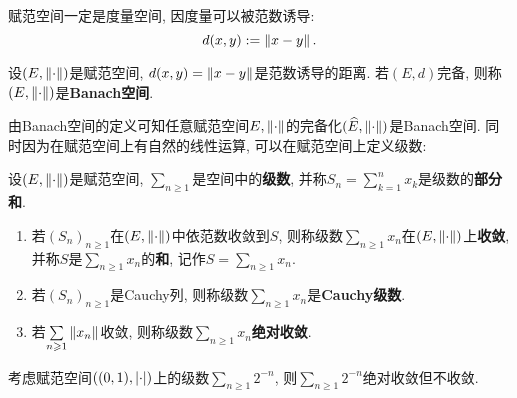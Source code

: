 	\begin{Remark}
	赋范空间一定是度量空间, 因度量可以被范数诱导:
	\[
	d(x,y):=\left\| x-y \right\|.
	\]
	\end{Remark}
	
	\begin{Definition}[Banach空间]\label{def:Banach空间}
	设$ (E,\left\| \cdot \right\|) $是赋范空间, $ d(x,y)=\left\| x-y \right\| $是范数诱导的距离. 若$ (E,d) $完备, 则称$ (E,\left\| \cdot \right\|) $是\textbf{Banach空间}.
	\end{Definition}
	
	由Banach空间的定义可知任意赋范空间$ E,\left\| \cdot \right\| $的完备化$ (\widehat{E},\left\| \cdot \right\|) $是Banach空间. 同时因为在赋范空间上有自然的线性运算, 可以在赋范空间上定义级数:
	
	\begin{Definition}[级数]\label{def:级数}
	设$ (E,\left\| \cdot \right\|) $是赋范空间, $ \sum\limits_{n\geqslant 1} $是空间中的\textbf{级数}, 并称$ S_n=\sum\limits_{k=1}^nx_k $是级数的\textbf{部分和}.
	
	\begin{enumerate}[(1)]
	\item 若$ (S_n)_{n\geqslant 1} $在$ (E,\left\| \cdot \right\|) $中依范数收敛到$ S $, 则称级数$ \sum\limits_{n\geqslant 1}x_n $在$ (E,\left\| \cdot \right\|) $上\textbf{收敛}, 并称$ S $是$ \sum\limits_{n\geqslant 1}x_n $的\textbf{和}, 记作$ S=\sum\limits_{n\geqslant 1}x_n $.
	
	\item 若$ (S_n)_{n\geqslant 1} $是Cauchy列, 则称级数$ \sum\limits_{n\geqslant 1}x_n $是\textbf{Cauchy级数}.
	
	\item 若$ \sum\limits_{n\geqslant 1}\left\| x_n \right\| $收敛, 则称级数$ \sum\limits_{n\geqslant 1}x_n $\textbf{绝对收敛}.
	\end{enumerate}
	\end{Definition}
	
	\begin{Remark}
	考虑赋范空间$ ((0,1),\left| \cdot \right| ) $上的级数$ \sum\limits_{n\geqslant 1}2^{-n} $, 则$ \sum\limits_{n\geqslant 1}2^{-n} $绝对收敛但不收敛.
	\end{Remark}
	
